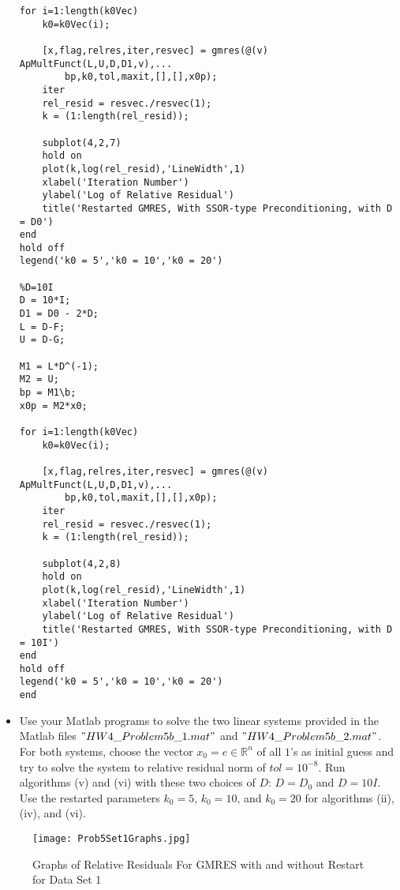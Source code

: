 \documentclass[12pt]{article}
\def\R{\mathbb{R}}
\begin{document}
\begin{itemize}
\begin{lstlisting}[caption=Function to Run Full and Restarted GMRES with Preconditioning Option]
for i=1:length(k0Vec)
    k0=k0Vec(i); 

    [x,flag,relres,iter,resvec] = gmres(@(v) ApMultFunct(L,U,D,D1,v),...
    	bp,k0,tol,maxit,[],[],x0p);
    iter
    rel_resid = resvec./resvec(1);
    k = (1:length(rel_resid));

    subplot(4,2,7)
    hold on
    plot(k,log(rel_resid),'LineWidth',1)
    xlabel('Iteration Number')
    ylabel('Log of Relative Residual')
    title('Restarted GMRES, With SSOR-type Preconditioning, with D = D0')
end
hold off
legend('k0 = 5','k0 = 10','k0 = 20')
 
%D=10I
D = 10*I;
D1 = D0 - 2*D;
L = D-F;
U = D-G;

M1 = L*D^(-1);
M2 = U;
bp = M1\b;
x0p = M2*x0;

for i=1:length(k0Vec)
    k0=k0Vec(i); 

    [x,flag,relres,iter,resvec] = gmres(@(v) ApMultFunct(L,U,D,D1,v),...
    	bp,k0,tol,maxit,[],[],x0p);
    iter
    rel_resid = resvec./resvec(1);
    k = (1:length(rel_resid));

    subplot(4,2,8)
    hold on
    plot(k,log(rel_resid),'LineWidth',1)
    xlabel('Iteration Number')
    ylabel('Log of Relative Residual')
    title('Restarted GMRES, With SSOR-type Preconditioning, with D = 10I')
end
hold off
legend('k0 = 5','k0 = 10','k0 = 20') 
end
\end{lstlisting}


\item[(b)] Use your Matlab programs to solve the two linear systems provided in the Matlab files $"HW4\_Problem5b\_1.mat"$ and $"HW4\_Problem5b\_2.mat"$.  For both systems, choose the vector $x_0 = e\in\R^n$ of all $1$'s as initial guess and try to solve the system to relative residual norm of $tol = 10^{-8}$.  Run algorithms (v) and (vi) with these two choices of $D$: $D=D_0$ and $D=10I$.  Use the restarted parameters $k_0=5$, $k_0=10$, and $k_0=20$ for algorithms (ii), (iv), and (vi).\\
\end{itemize}


\begin{figure}[H]
\hspace{-.3in}
\texttt{[image: Prob5Set1Graphs.jpg]}
\caption{Graphs of Relative Residuals For GMRES with and without Restart for Data Set 1}
\end{figure}
\end{document}
